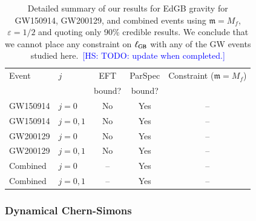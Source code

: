 \documentclass[twocolumn,
               prd,
               aps,
               superscriptaddress,
               tightenlines,
               nofootinbib,
               eqsecnum,
               amsfonts,
               amsmath,
               longbibliography]{revtex4-1}
\newcommand{\gm}{\mathfrak{m}}
\newcommand{\hs}[1]{{\textcolor{blue}{{[HS: #1]}} }}
\begin{document}
\begin{table}[h]
\begin{tabular}{l l c c c}
\hline
\hline
Event & $j$ & EFT    & ParSpec & Constraint ($\gm = M_{f}$) \\
      &     & bound? & bound?  &                            \\
\hline
GW150914 & $j = 0$    & No  & Yes & -- \\
GW150914 & $j = 0, 1$ & No  & Yes & -- \\
GW200129 & $j = 0$    & No  & Yes & -- \\
GW200129 & $j = 0, 1$ & No  & Yes & -- \\
Combined & $j = 0$    & --  & Yes & -- \\
Combined & $j = 0, 1$ & --  & Yes & -- \\
\hline
\hline
\end{tabular}
\caption{Detailed summary of our results for EdGB gravity for GW150914, GW200129, and
combined events using $\gm = M_{f}$, $\varepsilon = 1/2$ and quoting only 90\% credible results.
%
We conclude that we cannot place any constraint on $\ell_{\rm GB}$ with any of the GW events
studied here.~\hs{TODO: update when completed.}
}
\label{tab:summary_edgb}
\end{table}

\subsubsection{Dynamical Chern-Simons}
\label{sec:results_dcs}
\end{document}
